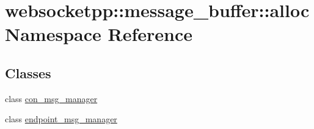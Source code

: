 \hypertarget{namespacewebsocketpp_1_1message__buffer_1_1alloc}{}\section{websocketpp\+:\+:message\+\_\+buffer\+:\+:alloc Namespace Reference}
\label{namespacewebsocketpp_1_1message__buffer_1_1alloc}
\subsection*{Classes}
\begin{DoxyCompactItemize}
\item 
class \hyperlink{classwebsocketpp_1_1message__buffer_1_1alloc_1_1con__msg__manager}{con\+\_\+msg\+\_\+manager}
\item 
class \hyperlink{classwebsocketpp_1_1message__buffer_1_1alloc_1_1endpoint__msg__manager}{endpoint\+\_\+msg\+\_\+manager}
\end{DoxyCompactItemize}
